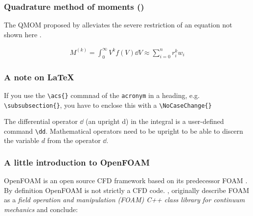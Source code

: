 \subsubsection{Quadrature method of moments  ()}

The \ac{QMOM} proposed by \citet{mcGraw1997} alleviates the severe restriction of 
an equation not shown here \cite{mcGraw1997}. 

\begin{gather}
	M^{(k)} = \int_0^\infty V^k f(V) \dd V \approx \sum_{i=0}^n r_i^k w_i \label{eq:qmomAssumption}
\end{gather}


%
%


\subsubsection*{A note on \LaTeX{}}

If you use the \verb+\acs{}+ commnad of the \verb+acronym+ in a heading, e.g. \verb+\subsubsection{}+, you 
have to enclose this with a \verb+\NoCaseChange{}+

The differential operator $\dd$ (an upright d) in the integral is a user-defined command \verb+\dd+. 
Mathematical operators need to be upright to be able to discern the variable $d$ from the operator $\dd$.





\subsubsection{A little introduction to OpenFOAM}

OpenFOAM is an open source CFD framework based on its predecessor \ac{FOAM} \cite{weller1998}. By 
definition OpenFOAM is not strictly a CFD code. \citet{weller1998},
\citet{weller1992} originally describe \ac{FOAM} as a \emph{field operation and
manipulation (\ac{FOAM}) C++ class library for continuum mechanics} and conclude:

